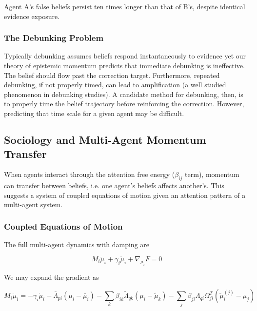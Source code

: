 \documentclass[12pt]{article}
\begin{document}
Agent A's false beliefs persist ten times longer than that of B's, despite identical evidence exposure.

\subsubsection{The Debunking Problem}

Typically debunking assumes beliefs respond instantaneously to evidence yet our theory of epistemic momentum predicts that immediate debunking is ineffective.  The belief should flow past the correction target. Furthermore, repeated debunking, if not properly timed, can lead to amplification (a well studied phenomenon in debunking studies).  A candidate method for debunking, then, is to properly time the belief trajectory before reinforcing the correction.  However, predicting that time scale for a given agent may be difficult.


\subsection{Sociology and Multi-Agent Momentum Transfer}

When agents interact through the attention free energy ($\beta_{ij}$ term), momentum can transfer between beliefs, i.e. one agent's beliefs affects another's. This suggests a system of coupled equations of motion given an attention pattern of a multi-agent system.

\subsubsection{Coupled Equations of Motion}

The full multi-agent dynamics with damping are

\begin{equation}
\boxed{M_i\ddot{\mu}_i + \gamma_i\dot{\mu}_i + \nabla_{\mu_i}F = 0}
\end{equation}

We may expand the gradient as 

\begin{equation}
M_i\ddot{\mu}_i = -\gamma_i\dot{\mu}_i - \bar{\Lambda}_{pi}(\mu_i - \bar{\mu}_i) - \sum_k\beta_{ik}\tilde{\Lambda}_{qk}(\mu_i - \tilde{\mu}_k) - \sum_j\beta_{ji}\Lambda_{qi}\Omega_{ji}^T(\tilde{\mu}_i^{(j)} - \mu_j)
\end{equation}
\end{document}
